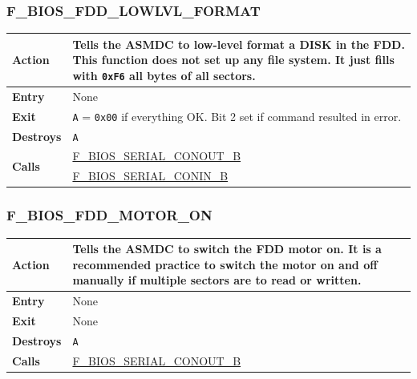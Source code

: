 \documentclass[a4paper,11pt]{article}
\begin{document}
        \subsubsection{F\_BIOS\_FDD\_LOWLVL\_FORMAT}
        \label{func:fbiosfddlowlvlformat}
        \begin{tabular}{l p{9cm}}
            \hline\textbf{Action}
            & Tells the \textbf{ASMDC} to low-level format a \textbf{DISK} in
            the \textbf{FDD}. This function does not set up any file system. It
            just fills with \texttt{0xF6} all bytes of all sectors.\\
            \hline\textbf{Entry} & None \\
            \hline\textbf{Exit} & \texttt{A} = \texttt{0x00} if everything OK. 
            Bit 2 set if command resulted in error.\\
            \hline\textbf{Destroys} & \texttt{A} \\
            \hline\multirow[t]{2}{4em}{\textbf{Calls}}
            & \hyperref[func:fbiosserialconoutb]{F\_BIOS\_SERIAL\_CONOUT\_B}\\
            & \hyperref[func:fbiosserialconinb]{F\_BIOS\_SERIAL\_CONIN\_B}\\
            \hline
        \end{tabular}

        \subsubsection{F\_BIOS\_FDD\_MOTOR\_ON}
        \label{func:fbiosfddmotoron}
        \begin{tabular}{l p{9cm}}
            \hline\textbf{Action}
            & Tells the \textbf{ASMDC} to switch the \textbf{FDD} motor on. It
            is a recommended practice to switch the motor on and off manually
            if multiple sectors are to read or written.\\
            \hline\textbf{Entry} & None \\
            \hline\textbf{Exit} & None \\
            \hline\textbf{Destroys} & \texttt{A} \\
            \hline\textbf{Calls}
            & \hyperref[func:fbiosserialconoutb]{F\_BIOS\_SERIAL\_CONOUT\_B}\\
            \hline
        \end{tabular}
\end{document}
